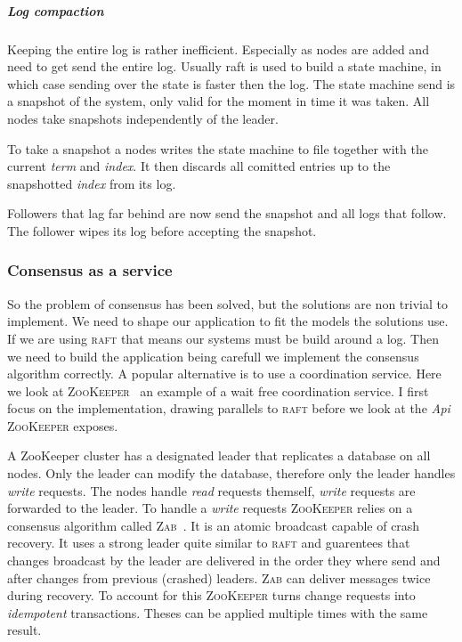 \subparagraph{Log compaction} \label{par:logcomp}
Keeping the entire log is rather inefficient. Especially as nodes are added and need to get send the entire log. Usually raft is used to build a state machine, in which case sending over the state is faster then the log. The state machine send is a snapshot of the system, only valid for the moment in time it was taken. All nodes take snapshots independently of the leader. 

To take a snapshot a nodes writes the state machine to file together with the current \textit{term} and \textit{index}. It then discards all comitted entries up to the snapshotted \textit{index} from its log. 

Followers that lag far behind are now send the snapshot and all logs that follow. The follower wipes its log before accepting the snapshot.

\subsubsection*{Consensus as a service}
So the problem of consensus has been solved, but the solutions are non trivial to implement. We need to shape our application to fit the models the solutions use. If we are using \textsc{raft} that means our systems must be build around a log. Then we need to build the application being carefull we implement the consensus algorithm correctly. A popular alternative is to use a coordination service. Here we look at \textsc{ZooKeeper}~\cite{zookeeper} an example of a wait free coordination service. I first focus on the implementation, drawing parallels to \textsc{raft} before we look at the \textit{Api} \textsc{ZooKeeper} exposes.

A ZooKeeper cluster has a designated leader that replicates a database on all nodes. Only the leader can modify the database, therefore only the leader handles \textit{write} requests. The nodes handle \textit{read} requests themself, \textit{write} requests are forwarded to the leader. To handle a \textit{write} requests \textsc{ZooKeeper} relies on a consensus algorithm called \textsc{Zab}~\cite{zab}. It is an atomic broadcast capable of crash recovery. It uses a strong leader quite similar to \textsc{raft} and guarentees that changes broadcast by the leader are delivered in the order they where send and after changes from previous (crashed) leaders. \textsc{Zab} can deliver messages twice during recovery. To account for this \textsc{ZooKeeper} turns change requests into \textit{idempotent} transactions. Theses can be applied multiple times with the same result.

